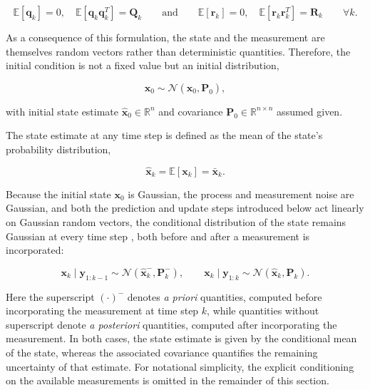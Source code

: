 \begin{equation}
	\mathbb{E}[\bm{q}_{k}] = 0, 
	\quad 
	\mathbb{E}[\bm{q}_{k}\bm{q}_{k}^T] = \bm{Q}_k
	\qquad 
	\text{and}
	\qquad
	\mathbb{E}[\bm{r}_k] = 0, 
	\quad 
	\mathbb{E}[\bm{r}_k \bm{r}_k^T] = \bm{R}_k
	\qquad
	\forall k.
\end{equation}

As a consequence of this formulation, the state and the measurement are themselves random vectors rather than deterministic quantities. Therefore, the initial condition is not a fixed value but an initial distribution,

\begin{equation}
	\bm{x}_0 \sim \mathcal{N}(\hat{\bm{x}}_0, \bm{P}_0),
\end{equation}

with initial state estimate $\hat{\bm{x}}_0 \in \mathbb{R}^{n}$ and covariance $\bm{P}_0 \in \mathbb{R}^{n \times n}$ assumed given.

The state estimate at any time step is defined as the mean of the state's probability distribution,

\begin{equation}
	\hat{\bm{x}}_k = \mathbb{E}[\bm{x}_k] = \bar{\bm{x}}_k.
\end{equation}

Because the initial state $\bm{x}_0$ is Gaussian, the process and measurement noise are Gaussian, and both the prediction and update steps introduced below act linearly on Gaussian random vectors, the conditional distribution of the state remains Gaussian at every time step \cite{Särkkä2013KF}, both before and after a measurement is incorporated:

\begin{equation}
	\bm{x}_k \mid \bm{y}_{1:k-1} \sim \mathcal{N}(\hat{\bm{x}}_k^-, \bm{P}_k^-), 
	\qquad 
	\bm{x}_k \mid \bm{y}_{1:k} \sim \mathcal{N}(\hat{\bm{x}}_k, \bm{P}_k).
	\label{eq:gaussian_prior_post}
\end{equation}

Here the superscript $(\cdot)^-$ denotes \emph{a priori} quantities, computed before incorporating the measurement at time step $k$, while quantities without superscript denote \emph{a posteriori} quantities, computed after incorporating the measurement. In both cases, the state estimate is given by the conditional mean of the state, whereas the associated covariance quantifies the remaining uncertainty of that estimate.
For notational simplicity, the explicit conditioning on the available measurements is omitted in the remainder of this section.

